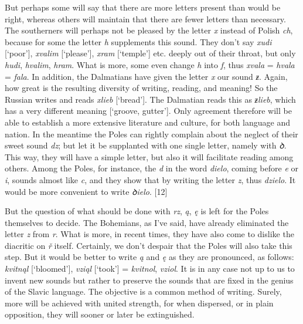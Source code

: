 But perhaps some will say that there are more letters present than would be right, whereas others will maintain that there are fewer letters than necessary. The southerners will perhaps not be pleased by the letter \textit{x} instead of Polish \textit{ch}, because for some the letter \textit{h} supplements this sound. They don’t say \textit{xudi} [‘poor’], \textit{xvalim} [‘please’], \textit{xram} [‘temple’] etc. deeply out of their throat, but only \textit{hudi}, \textit{hvalim}, \textit{hram}. What is more, some even change \textit{h} into \textit{f}, thus \textit{xvala} = \textit{hvala} = \textit{fala}. In addition, the Dalmatians have given the letter \textit{x} our sound \textit{ƶ}. Again, how great is the resulting diversity of writing, reading, and meaning! So the Russian writes and reads \textit{xlieb} [‘bread’]. The Dalmatian reads this as \textit{ƶlieb}, which has a very different meaning [‘groove, gutter’]. Only agreement therefore will be able to establish a more extensive literature and culture, for both language and nation. In the meantime the Poles can rightly complain about the neglect of their sweet sound \textit{dz}; but let it be supplanted with one single letter, namely with \textit{ꝺ}. This way, they will have a simple letter, but also it will facilitate reading among others. Among the Poles, for instance, the \textit{d} in the word \textit{dielo}, coming before \textit{e} or \textit{i}, sounds almost like \textit{c}, and they show that by writing the letter \textit{z}, thus \textit{dzielo}. It would be more convenient to write \textit{ꝺielo}. [12]

But the question of what should be done with \textit{rz}, \textit{ą}, \textit{ę} is left for the Poles themselves to decide. The Bohemians, as I’ve said, have already eliminated the letter \textit{z} from \textit{r}. What is more, in recent times, they have also come to dislike the diacritic on \textit{ř} itself. Certainly, we don’t despair that the Poles will also take this step. But it would be better to write \textit{ą} and \textit{ę} as they are pronounced, as follows: \textit{kvitnąl} [‘bloomed’], \textit{vziąl} [‘took’] = \textit{kvitnol}, \textit{vziol}. It is in any case not up to us to invent new sounds but rather to preserve the sounds that are fixed in the genius of the Slavic language. The objective is a common method of writing. Surely, more will be achieved with united strength, for when dispersed, or in plain opposition, they will sooner or later be extinguished.

